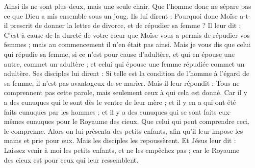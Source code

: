 \begin{multicols}{2}
Ainsi ils ne sont plus deux, mais une seule chair{}. Que l’homme donc ne sépare pas ce que Dieu a mis ensemble sous un joug{}.
Ils lui dirent : Pourquoi donc Moïse a-t-il prescrit de donner la lettre de divorce, et de répudier sa femme{} ?
Il leur dit : C'est à cause de la dureté de votre cœur que Moïse vous a permis de répudier vos femmes ; mais au commencement il n'en était pas ainsi.
Mais je vous dis que celui qui répudie sa femme, si ce n'est pour cause d'adultère{}, et qui en épouse une autre, commet un adultère ; et celui qui épouse une femme répudiée commet un adultère.
Ses disciples lui dirent : Si telle est la condition de l'homme à l'égard de sa femme, il n’est pas avantageux de se marier.
Mais il leur répondit : Tous ne comprennent pas cette parole, mais seulement ceux à qui cela est donné.
Car il y a des eunuques qui le sont dès le ventre de leur mère ; et il y en a qui ont été faits eunuques par les hommes ; et il y a des eunuques qui se sont faits eux-mêmes eunuques pour le Royaume des cieux. Que celui qui peut comprendre ceci, le comprenne.
Alors on lui présenta des petits enfants, afin qu'il leur impose les mains et prie pour eux. Mais les disciples les repoussèrent.
Et Jésus leur dit : Laissez venir à moi les petits enfants, et ne les empêchez pas ; car le Royaume des cieux est pour ceux qui leur ressemblent.

\end{multicols}
